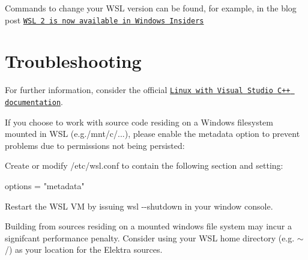Commands to change your W\+SL version can be found, for example, in the blog post \href{https://devblogs.microsoft.com/commandline/wsl-2-is-now-available-in-windows-insiders/}{\tt W\+SL 2 is now available in Windows Insiders}\hypertarget{doc_tutorials_contributing-windows_md_autotoc_md3799}{}\section{Troubleshooting}\label{doc_tutorials_contributing-windows_md_autotoc_md3799}
For further information, consider the official \href{https://docs.microsoft.com/en-us/cpp/linux/?view=msvc-160}{\tt Linux with Visual Studio C++ documentation}.

If you choose to work with source code residing on a Windows filesystem mounted in W\+SL (e.\+g.{\ttfamily /mnt/c/...}), please enable the {\ttfamily metadata} option to prevent problems due to permissions not being persisted\+:


\begin{DoxyItemize}
\item Create or modify {\ttfamily /etc/wsl.conf} to contain the following section and setting\+:
\end{DoxyItemize}


\begin{DoxyCode}
[automount]
options = "metadata"
\end{DoxyCode}



\begin{DoxyItemize}
\item Restart the W\+SL VM by issuing {\ttfamily wsl -\/-\/shutdown} in your window console.
\end{DoxyItemize}

Building from sources residing on a mounted windows file system may incur a signifcant performance penalty. Consider using your W\+SL home directory (e.\+g. {\ttfamily $\sim$/}) as your location for the Elektra sources. 